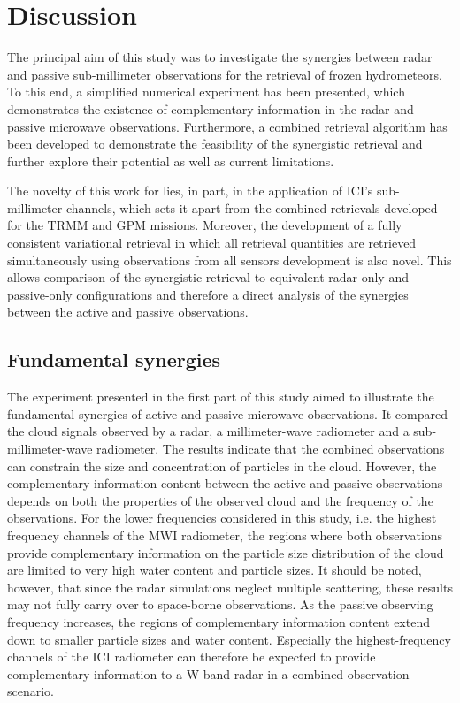 \documentclass[journal abbreviation, manuscript]{copernicus}
\begin{document}
\section{Discussion}
\label{sec:discussion}

The principal aim of this study was to investigate the synergies between radar
and passive sub-millimeter observations for the retrieval of frozen
hydrometeors. To this end, a simplified numerical experiment has been presented,
which demonstrates the existence of complementary information in the radar and
passive microwave observations. Furthermore, a combined retrieval algorithm has
been developed to demonstrate the feasibility of the synergistic retrieval and
further explore their potential as well as current limitations.

The novelty of this work for lies, in part, in the application of ICI's
sub-millimeter channels, which sets it apart from the combined retrievals
developed for the TRMM and GPM missions. Moreover, the development of a fully
consistent variational retrieval in which all retrieval quantities are retrieved
simultaneously using observations from all sensors development is also novel.
This allows comparison of the synergistic retrieval to equivalent radar-only and
passive-only configurations and therefore a direct analysis of the synergies
between the active and passive observations.

\subsection{Fundamental synergies}

The experiment presented in the first part of this study aimed to illustrate the
fundamental synergies of active and passive microwave observations. It compared
the cloud signals observed by a radar, a millimeter-wave radiometer and a
sub-millimeter-wave radiometer. The results indicate that the combined
observations can constrain the size and concentration of particles in the cloud.
However, the complementary information content between the active and passive
observations depends on both the properties of the observed cloud and the
frequency of the observations. For the lower frequencies considered in this
study, i.e. the highest frequency channels of the MWI radiometer, the regions
where both observations provide complementary information on the particle size
distribution of the cloud are limited to very high water content and particle
sizes. It should be noted, however, that since the radar simulations neglect
multiple scattering, these results may not fully carry over to space-borne
observations. As the passive observing frequency increases, the regions of
complementary information content extend down to smaller particle sizes and
water content. Especially the highest-frequency channels of the ICI radiometer
can therefore be expected to provide complementary information to a W-band radar
in a combined observation scenario.
\end{document}
